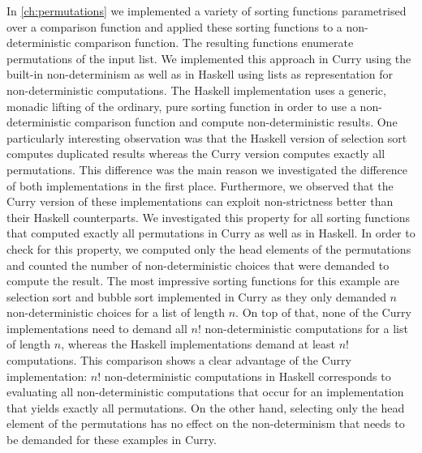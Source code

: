 In \autoref{ch:permutations} we implemented a variety of sorting functions parametrised over a comparison function and applied these sorting functions to a non\--deterministic comparison function.
The resulting functions enumerate permutations of the input list.
We implemented this approach in Curry using the built\--in non\--determinism as well as in Haskell using lists as representation for non\--deterministic computations.
The Haskell implementation uses a generic, monadic lifting of the ordinary, pure sorting function in order to use a non\--deterministic comparison function and compute non\--deterministic results.
One particularly interesting observation was that the Haskell version of selection sort computes duplicated results whereas the Curry version computes exactly all permutations.
This difference was the main reason we investigated the difference of both implementations in the first place.
Furthermore, we observed that the Curry version of these implementations can exploit non\--strictness better than their Haskell counterparts.
We investigated this property for all sorting functions that computed exactly all permutations in Curry as well as in Haskell.
In order to check for this property, we computed only the head elements of the permutations and counted the number of non\--deterministic choices that were demanded to compute the result.
The most impressive sorting functions for this example are selection sort and bubble sort implemented in Curry as they only demanded $n$ non\--deterministic choices for a list of length $n$.
On top of that, none of the Curry implementations need to demand all $n!$ non\--deterministic computations for a list of length $n$, whereas the Haskell implementations demand at least $n!$ computations.
This comparison shows a clear advantage of the Curry implementation: $n!$ non\--deterministic computations in Haskell corresponds to evaluating all non\--deterministic computations that occur for an implementation that yields exactly all permutations.
On the other hand, selecting only the head element of the permutations has no effect on the non\--determinism that needs to be demanded for these examples in Curry.

